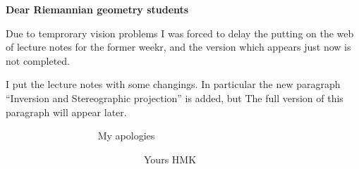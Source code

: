 

\centerline
   {\bf Dear Riemannian geometry students}

  Due to temprorary vision problems I was forced to delay the putting
on the web  of lecture notes for the former weekr, and
the version which appears just now is not completed.

  I put the lecture notes with some  changings.
 In particular the new paragraph 
 ``Inversion and Stereographic projection'' is added, but  
The full version of this paragraph will appear  later.

   $\qquad$ 
   $\qquad$ 
   $\qquad$ 
   $\qquad$ 
  My apologies 


   $\qquad$ 
   $\qquad$ 
   $\qquad$ 
   $\qquad$ 
   $\qquad$ 
   $\qquad$ 
                  Yours HMK
   

\bye 
